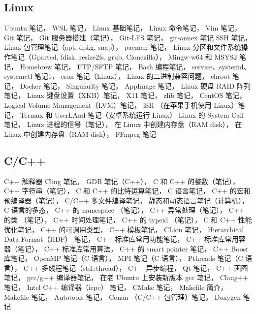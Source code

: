 \subsection{Linux}
Ubuntu 笔记，
WSL 笔记，
Linux 基础笔记，
Linux 命令笔记，
Vim 笔记，
Git 笔记，
Git 服务器搭建（笔记），
Git-LFS 笔记，
git-annex 笔记
SSH 笔记，
Linux 包管理笔记（apt, dpkg, snap），
pacman 笔记，
Linux 分区和文件系统操作笔记（Gparted, fdisk, resize2fs, grub, Clonezilla），
Mingw-w64 和 MSYS2 笔记，
Homebrew 笔记，
FTP/SFTP 笔记，
Bash 编程笔记，
service、systemd、systemctl 笔记1，
cron 笔记（Linux），
Linux 的二进制兼容问题，
chroot 笔记，
Docker 笔记，
Singularity 笔记，
AppImage 笔记，
Linux 硬盘 RAID 阵列笔记，
Linux 键盘设置（XKB）笔记，
X11 笔记，
zlib 笔记，
CentOS 笔记，
Logical Volume Management（LVM）笔记，
iSH （在苹果手机使用 Linux）笔记，
Termux 和 UserLAnd 笔记（安卓系统运行 Linux）
Linux 的 System Call 笔记，
Linux 进程的信号（笔记），
在 Linux 中创建内存盘（RAM disk），
在 Linux 中创建内存盘（RAM disk），
FFmpeg 笔记

\subsection{C/C++}
C++ 解释器 Cling 笔记，
GDB 笔记（C++），
C 和 C++ 的整数（笔记），
C++ 字符串（笔记），
C 和 C++ 的比特运算笔记，
C 语言笔记，
C++ 的宏和预编译器（笔记），
C/C++ 多文件编译笔记，
静态和动态语言笔记（计算机），
C 语言的多态，
C++ 的 namespace （笔记），
C++ 异常处理（笔记），
C++ 的类 （笔记），
C++ 时间处理笔记，
C++ 的 typeid （笔记），
C 和 C++ 性能优化笔记，
C++ 的可调用类型，
C++ 模板笔记，
CLion 笔记，
Hierarchical Data Format（HDF） 笔记，
C++ 标准库常用功能笔记，
C++ 标准库常用容器（笔记），
C++ 标准库常用算法，
C++ 的 smart pointer 笔记，
C++ Boost 库笔记，
OpenMP 笔记（C 语言），
MPI 笔记（C 语言），
Pthreads 笔记（C 语言），
C++ 多线程笔记（std::thread），
C++ 异步编程，
Qt 笔记，
C++ 画图笔记，
gcc/g++ 编译器笔记，
在老 Ubuntu 上安装新版本 gcc 笔记，
Clang++ 笔记，
Intel C++ 编译器（icpc） 笔记，
CMake 笔记，
Makefile 简介，
Makefile 笔记，
Autotools 笔记，
Conan （C/C++ 包管理）笔记，
Doxygen 笔记

